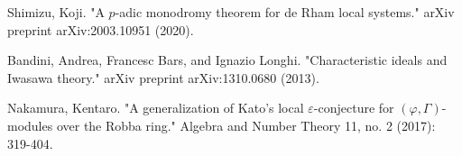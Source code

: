 \documentclass[12pt]{amsart}
\theoremstyle{definition}
\numberwithin{equation}{section}
\begin{document}
\begin{thebibliography}{10}
 Shimizu, Koji. "A $p$-adic monodromy theorem for de Rham local systems." arXiv preprint arXiv:2003.10951 (2020).

 Bandini, Andrea, Francesc Bars, and Ignazio Longhi. "Characteristic ideals and Iwasawa theory." arXiv preprint arXiv:1310.0680 (2013).


 Nakamura, Kentaro. "A generalization of Kato's local $\varepsilon$-conjecture for $(\varphi, \Gamma)$-modules over the Robba ring." Algebra and Number Theory 11, no. 2 (2017): 319-404.



\end{thebibliography}



%
\end{document}
